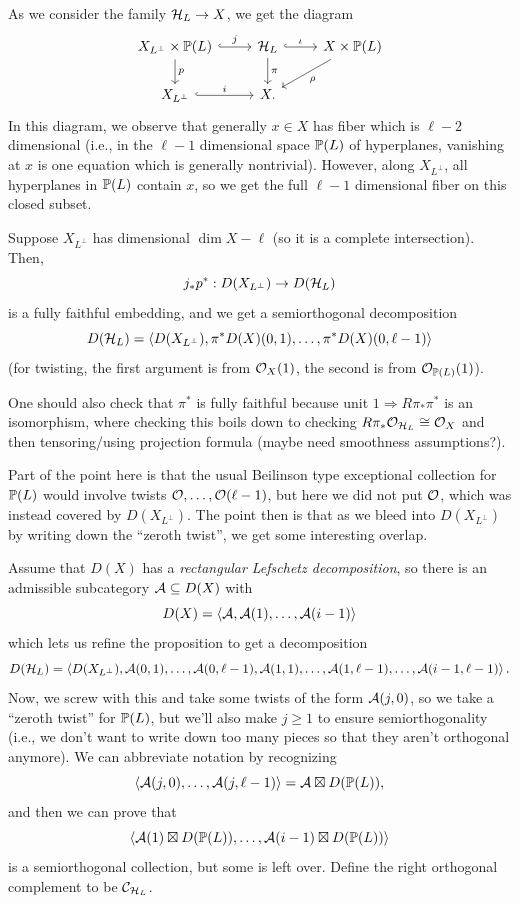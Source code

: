 \documentclass[12pt]{article}
\begin{document}
As we consider the family $\cH_L \to X$, we get the diagram
\[\begin{tikzcd}
    X_{L^\perp} \times \P(L) \rar[hook,"j"] \dar["p"] & \cH_L \rar[hook,"\iota"] \dar["\pi"] & X\times \P(L) \ar[ld,"\rho"]\\
    X_{L^\perp} \rar[hook,"i"] & X. &
\end{tikzcd}\]
In this diagram, we observe that generally $x\in X$ has fiber which is $\ell-2$ dimensional (i.e., in the $\ell-1$ dimensional space $\P(L)$ of hyperplanes, vanishing at $x$ is one equation which is generally nontrivial). However, along $X_{L^\perp}$, all hyperplanes in $\P(L)$ contain $x$, so we get the full $\ell-1$ dimensional fiber on this closed subset.

\begin{prop}
    Suppose $X_{L^\perp}$ has dimensional $\dim X-\ell$ (so it is a complete intersection). Then,
    \[j_* p^*: D(X_{L^\perp}) \to D(\cH_L)\]
    is a fully faithful embedding, and we get a semiorthogonal decomposition
    \[D(\cH_L) = \<D(X_{L^\perp}), \pi^*D(X)(0,1),\dots,\pi^*D(X)(0,\ell-1)\>\]
    (for twisting, the first argument is from $\cO_X(1)$, the second is from $\cO_{\P(L)}(1)$).
\end{prop}

One should also check that $\pi^*$ is fully faithful because unit $1\Rightarrow R\pi_*\pi^*$ is an isomorphism, where checking this boils down to checking $R\pi_* \cO_{\cH_L} \cong \cO_X$ and then tensoring/using projection formula (maybe need smoothness assumptions?).

Part of the point here is that the usual Beilinson type exceptional collection for $\P(L)$ would involve twists $\cO,\dots,\cO(\ell-1)$, but here we did not put $\cO$, which was instead covered by $D(X_{L^\perp})$. The point then is that as we bleed into $D(X_{L^\perp})$ by writing down the ``zeroth twist'', we get some interesting overlap.

Assume that $D(X)$ has a \textit{rectangular Lefschetz decomposition}, so there is an admissible subcategory $\cA \subseteq D(X)$ with
\[D(X) = \<\cA,\cA(1),\dots,\cA(i-1)\>\]
which lets us refine the proposition to get a decomposition
\[D(\cH_L) = \<D(X_{L^\perp}), \cA(0,1), \dots, \cA(0,\ell-1), \cA(1,1),\dots,\cA(1,\ell-1),\dots,\cA(i-1,\ell-1)\>.\]
Now, we screw with this and take some twists of the form $\cA(j,0)$, so we take a ``zeroth twist'' for $\P(L)$, but we'll also make $j\geq 1$ to ensure semiorthogonality (i.e., we don't want to write down too many pieces so that they aren't orthogonal anymore). We can abbreviate notation by recognizing
\[\<\cA(j,0),\dots,\cA(j,\ell-1)\> = \cA \boxtimes D(\P(L)),\]
and then we can prove that
\[\<\cA(1)\boxtimes D(\P(L)),\dots,\cA(i-1)\boxtimes D(\P(L))\>\]
is a semiorthogonal collection, but some is left over. Define the right orthogonal complement to be $\cC_{\cH_L}$.
\end{document}
